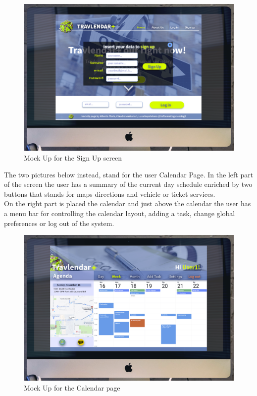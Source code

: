 \begin{figure}[H]
    \centering
    \includegraphics[scale=0.2]{Pictures/UXDiagram/desktopMockUpSignIn.png}
    \caption{Mock Up for the Sign Up screen}
    \label{fig:my_label}
\end{figure}

The two pictures below instead, stand for the user Calendar Page. In the left part of the screen the user has a summary of the current day schedule enriched by two buttons that stands for maps directions and vehicle or ticket services. \\On the right part is placed the calendar and just above the calendar the user has a menu bar for controlling the calendar layout, adding a task, change global preferences or log out of the system. 

\begin{figure}[H]
    \centering
    \includegraphics[scale=0.2]{Pictures/UXDiagram/desktopMockUpCalendar.png}
    \caption{Mock Up for the Calendar page}
    \label{fig:calendarMockUp}
\end{figure}

